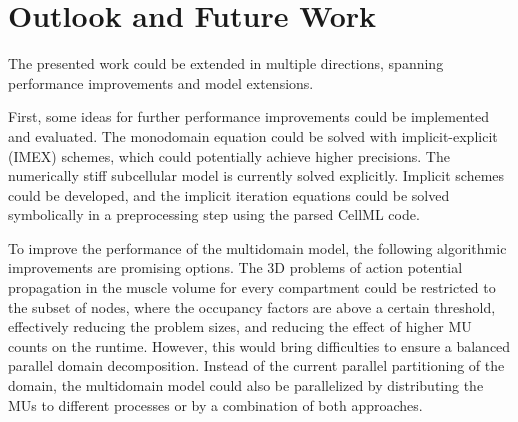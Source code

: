 








\section{Outlook and Future Work}\label{sec:future_work}
 
The presented work could be extended in multiple directions, spanning performance improvements and model extensions.

First, some ideas for further performance improvements could be implemented and evaluated. 
The monodomain equation could be solved with implicit-explicit (IMEX) schemes, which could potentially achieve higher precisions. 
The numerically stiff subcellular model is currently solved explicitly. Implicit schemes could be developed, and the implicit iteration equations could be solved symbolically in a preprocessing step using the parsed CellML code. 

To improve the performance of the multidomain model, the following algorithmic improvements are promising options. 
The 3D problems of action potential propagation in the muscle volume for every compartment could be restricted to the subset of nodes, where the occupancy factors are above a certain threshold, effectively reducing the problem sizes, and reducing the effect of higher MU counts on the runtime. However, this would bring difficulties to ensure a balanced parallel domain decomposition.
Instead of the current parallel partitioning of the domain, the multidomain model could also be parallelized by distributing the MUs to different processes or by a combination of both approaches.

